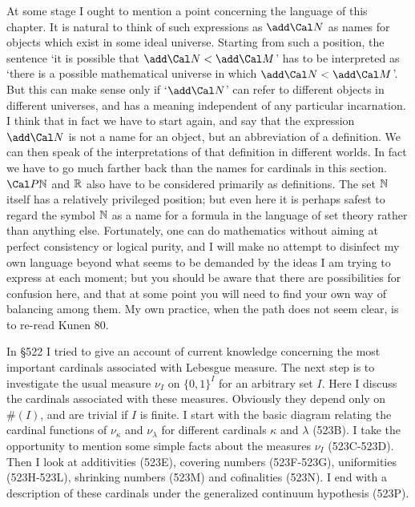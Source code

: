 {At some stage I ought to mention a point concerning the language of this
chapter.   It is natural to think of such expressions as $\add\Cal N$ as
names for
objects which exist in some ideal universe.   Starting from such a
position, the sentence `it is possible that $\add\Cal N<\add\Cal M$' has
to be interpreted as
`there is a possible mathematical universe in which
$\add\Cal N<\add\Cal M$'.   But this can make sense only if
`$\add\Cal N$' can refer to different objects in
different universes, and has a meaning independent of any particular
incarnation.   I think that in fact we have to start again,
and say that the expression $\add\Cal N$ is not a name
for an object, but an abbreviation of a definition.   We can then speak
of the interpretations of that definition in different worlds.   In fact
we have to go much
farther back than the names for cardinals in this section.
$\Cal P\Bbb N$ and $\Bbb R$ also have to be considered primarily as
definitions.   The set $\Bbb N$
itself has a relatively privileged position;  but even here it is
perhaps safest to regard the symbol $\Bbb N$ as a name for a formula in
the language of set theory
rather than anything else.   Fortunately, one can do mathematics without
aiming at perfect consistency or logical purity, and I will make no
attempt to disinfect
my own language beyond what seems to be demanded by the ideas I am
trying to express at each moment;  but you should be aware that there
are possibilities for confusion here, and that at some point you will
need to find your own way of balancing among them.   My own practice,
when the path does not seem clear, is to re-read {\smc Kunen 80}.
}%

\discrpage


\def\chaptername{Cardinal functions of measure theory}
\def\sectionname{The measure of $\{0,1\}^I$}


\def\headlinesectionname{The measure of
$\{0,1{\delimiter"5267309 }^I$}

In \S522 I tried to give an account of current knowledge concerning
the most important cardinals associated with Lebesgue measure.   The
next step is to investigate the usual measure $\nu_I$ on $\{0,1\}^I$
for an arbitrary set $I$.   Here I discuss the cardinals
associated with these measures.   Obviously they depend only on $\#(I)$,
and are trivial if $I$ is finite.   I start with the basic diagram
relating the cardinal functions
of $\nu_{\kappa}$ and $\nu_{\lambda}$ for different cardinals $\kappa$
and $\lambda$ (523B).   I take the opportunity to mention some simple facts
about the measures $\nu_I$ (523C-523D). %
Then I look at additivities (523E), covering numbers (523F-523G),
uniformities (523H-523L), %
shrinking numbers (523M) and cofinalities (523N).   I end with a
description of these cardinals under the generalized continuum
hypothesis (523P).

